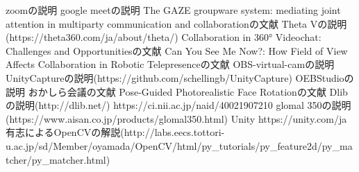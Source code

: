 
zoomの説明
google meetの説明
The GAZE groupware system: mediating joint attention in multiparty communication and collaborationの文献
Theta Vの説明(https://theta360.com/ja/about/theta/)
Collaboration in 360° Videochat: Challenges and Opportunitiesの文献
Can You See Me Now?: How Field of View Affects Collaboration in Robotic Telepresenceの文献
OBS-virtual-camの説明
UnityCaptureの説明(https://github.com/schellingb/UnityCapture)
OEBStudioの説明
おかしら会議の文献
Pose-Guided Photorealistic Face Rotationの文献
Dlibの説明(http://dlib.net/)
https://ci.nii.ac.jp/naid/40021907210
glomal 350の説明(https://www.aisan.co.jp/products/glomal350.html)
Unity https://unity.com/ja
有志によるOpenCVの解説(http://labs.eecs.tottori-u.ac.jp/sd/Member/oyamada/OpenCV/html/py\_tutorials/py\_feature2d/py\_matcher/py\_matcher.html)